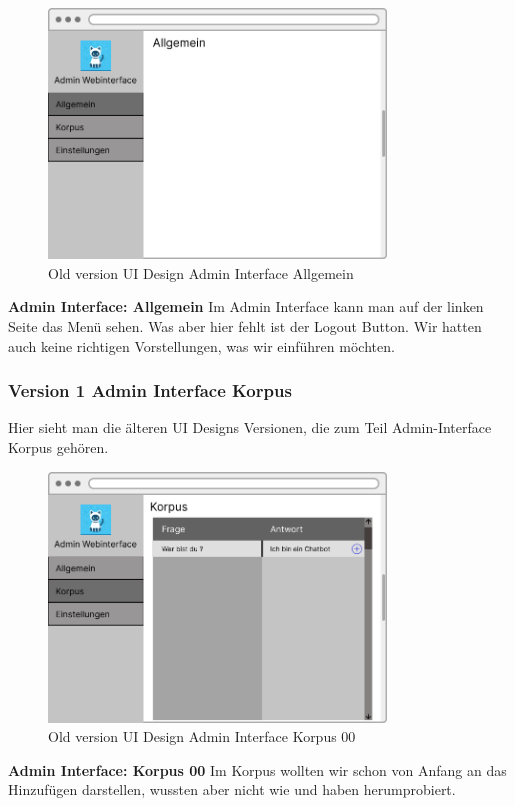 \begin{figure}[H]
    \centering
    \includegraphics[width=0.8\textwidth]{bilder/old vers. UI Design/Admin Interface Allgemein.png}
    \caption{Old version UI Design Admin Interface Allgemein}
    \label{fig:Old version UI Design Admin Interface Allgemein}
    \end{figure}
\noindent \textbf{Admin Interface: Allgemein} \newline
Im Admin Interface kann man auf der linken Seite das Menü sehen. Was aber hier fehlt ist der Logout Button.
Wir hatten auch keine richtigen Vorstellungen, was wir einführen möchten.

\newpage

\subsubsection{Version 1 Admin Interface Korpus}
Hier sieht man die älteren UI Designs Versionen, die zum Teil Admin-Interface Korpus gehören.

\begin{figure}[H]
    \centering
    \includegraphics[width=0.8\textwidth]{bilder/old vers. UI Design/Admin Interface (1).png}
    \caption{Old version UI Design Admin Interface Korpus 00}
    \label{fig:Old version UI Design Admin Interface Korpus 00}
    \end{figure}
\noindent \textbf{Admin Interface: Korpus 00} \newline
Im Korpus wollten wir schon von Anfang an das Hinzufügen darstellen, wussten aber nicht
wie und haben herumprobiert.

